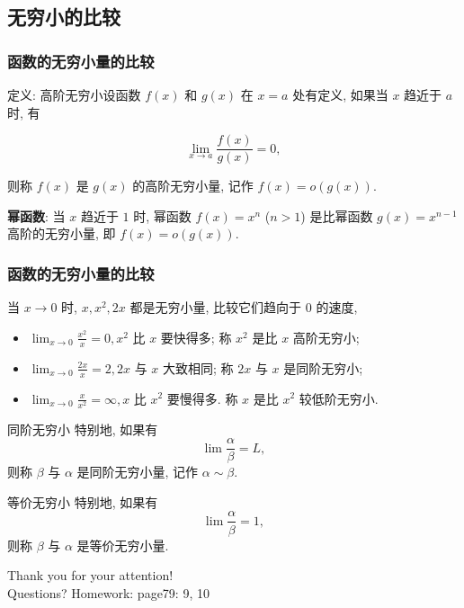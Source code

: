 \documentclass[
10pt, 
aspectratio=43, 
]{beamer}
\begin{document}
\subsection{无穷小的比较}
\begin{frame}
	\frametitle{函数的无穷小量的比较}
	
	\begin{block}{定义: 高阶无穷小}设函数 $f(x)$ 和 $g(x)$ 在 $x=a$ 处有定义, 如果当 $x$ 趋近于 $a$ 时, 有 
		
		\[
			\lim_{x\to a}\frac{f(x)}{g(x)}=0, 
		\]
		
		则称 $f(x)$ 是 $g(x)$ 的高阶无穷小量, 记作 $f(x) = o(g(x))$. 
	\end{block}
	\pause
	\textbf{幂函数}: 当 $x$ 趋近于 $1$ 时, 幂函数 $f(x) = x^n$ ($n>1$) 是比幂函数 $g(x) = x^{n-1}$ 高阶的无穷小量, 即 $f(x) = o(g(x))$. 
	\pause
\end{frame}

\begin{frame}
	\frametitle{函数的无穷小量的比较}
	当 $x\to0$ 时,  $x,  x^2,  2 x$ 都是无穷小量,  比较它们趋向于 0 的速度, 
	\begin{itemize}
		\item $\lim _{x \rightarrow 0} \frac{x^2}{x}=0,  x^2$ 比 $x$ 要快得多; 称 $x^2$ 是比 $x$ 高阶无穷小;
		\item $\lim _{x \rightarrow 0} \frac{2 x}{x}=2, 2 x$ 与 $x$ 大致相同; 称 $2 x$ 与 $x$ 是同阶无穷小;
		\item $\lim _{x \rightarrow 0} \frac{x}{x^2}=\infty,  x$ 比 $x^2$ 要慢得多. 称 $x$ 是比 $x^2$ 较低阶无穷小. 
	\end{itemize}
	\pause
	\begin{block}{同阶无穷小}
		特别地, 如果有
		$$
		\lim \frac{\alpha}{\beta} = L, 
		$$
		则称 $\beta$ 与 $\alpha$ 是同阶无穷小量, 记作 $\alpha \sim \beta$.
	\end{block}
	\pause
	\begin{block}{等价无穷小}
		特别地, 如果有
		$$
		\lim \frac{\alpha}{\beta} = 1, 
		$$
		则称 $\beta$ 与 $\alpha$ 是等价无穷小量.
	\end{block}
\end{frame}



\begin{frame}[plain]
	\vfill
	\centering
	{
		\centering \Huge \color{white} Thank you for your attention!\\[10pt]Questions?
		Homework:  page79:  9,  10
	}
	\vfill
\end{frame}
\end{document}
